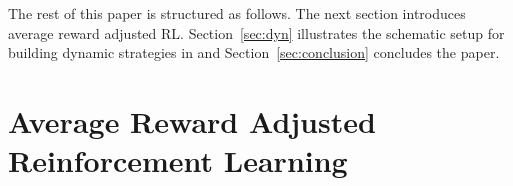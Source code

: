 \documentclass[envcountsame]{llncs}
\newcommand\MS[2][r]{\ifx t#1 \textcolor{blue}{[#2]}%
\else \begin{center}\textcolor{blue}{#2} \end{center} \fi}%
\begin{document}






The rest of this paper is structured as follows. The next section introduces average reward adjusted
RL\@. Section~\ref{sec:dyn} illustrates the schematic setup for building dynamic strategies in
\tct{} and Section~\ref{sec:conclusion} concludes the paper.


\section{Average Reward Adjusted Reinforcement Learning}\label{sec:average}
\end{document}
